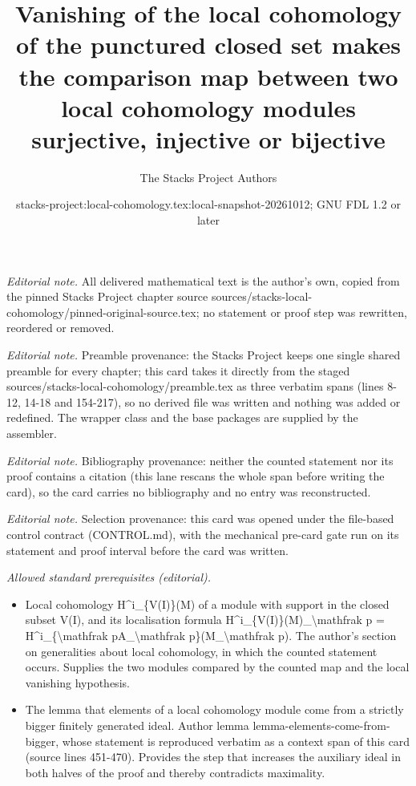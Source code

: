 \documentclass[10pt,a4paper]{amsart}
\title{Vanishing of the local cohomology of the punctured closed set makes the comparison map between two local cohomology modules surjective, injective or bijective}
\author{The Stacks Project Authors}
\date{stacks-project:local-cohomology.tex:local-snapshot-20261012; GNU FDL 1.2 or later}
\theoremstyle{plain}
\theoremstyle{definition}
\theoremstyle{remark}
\numberwithin{equation}{subsection}
\begin{document}
\maketitle
\noindent\textit{Editorial note.} All delivered mathematical text is the author's own, copied from the pinned Stacks Project chapter source sources/stacks-local-cohomology/pinned-original-source.tex; no statement or proof step was rewritten, reordered or removed.\par\medskip
\noindent\textit{Editorial note.} Preamble provenance: the Stacks Project keeps one single shared preamble for every chapter; this card takes it directly from the staged sources/stacks-local-cohomology/preamble.tex as three verbatim spans (lines 8-12, 14-18 and 154-217), so no derived file was written and nothing was added or redefined. The wrapper class and the base packages are supplied by the assembler.\par\medskip
\noindent\textit{Editorial note.} Bibliography provenance: neither the counted statement nor its proof contains a citation (this lane rescans the whole span before writing the card), so the card carries no bibliography and no entry was reconstructed.\par\medskip
\noindent\textit{Editorial note.} Selection provenance: this card was opened under the file-based control contract (CONTROL.md), with the mechanical pre-card gate run on its statement and proof interval before the card was written.\par\medskip
\noindent\textit{Allowed standard prerequisites (editorial).}\begin{itemize}
\item Local cohomology H\textasciicircum{}i\_\{V(I)\}(M) of a module with support in the closed subset V(I), and its localisation formula H\textasciicircum{}i\_\{V(I)\}(M)\_\textbackslash{}mathfrak p = H\textasciicircum{}i\_\{\textbackslash{}mathfrak pA\_\textbackslash{}mathfrak p\}(M\_\textbackslash{}mathfrak p). The author's section on generalities about local cohomology, in which the counted statement occurs. Supplies the two modules compared by the counted map and the local vanishing hypothesis.
\item The lemma that elements of a local cohomology module come from a strictly bigger finitely generated ideal. Author lemma lemma-elements-come-from-bigger, whose statement is reproduced verbatim as a context span of this card (source lines 451-470). Provides the step that increases the auxiliary ideal in both halves of the proof and thereby contradicts maximality.
\end{itemize}\medskip
\end{document}
